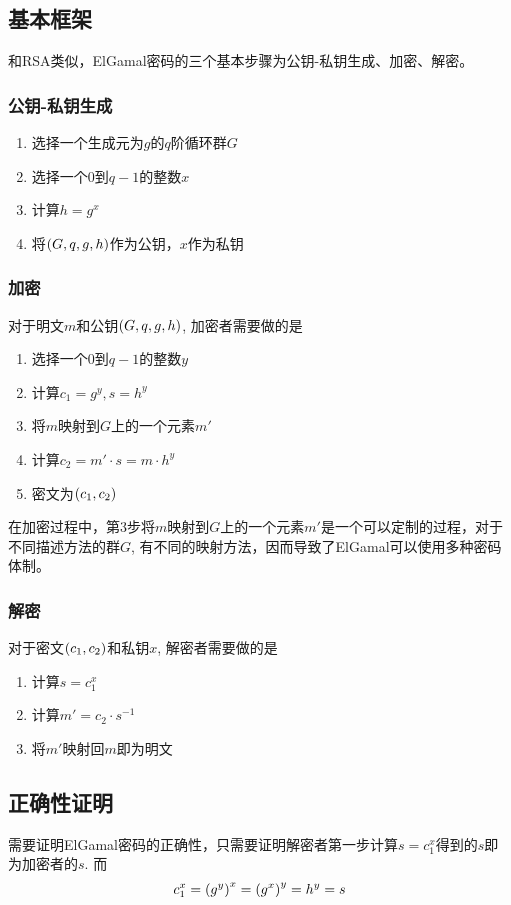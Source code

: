\subsection{基本框架}
和RSA类似，ElGamal密码的三个基本步骤为公钥-私钥生成、加密、解密。
\subsubsection{公钥-私钥生成}
\begin{enumerate}
	\item 选择一个生成元为$g$的$q$阶循环群$G$
	\item 选择一个$0$到$q-1$的整数$x$
	\item 计算$h=g^x$
	\item 将$\left( {G, q, g, h}\right)$作为公钥，$x$作为私钥
\end{enumerate}
\subsubsection{加密}
对于明文$m$和公钥$\left( {G, q, g, h}\right)$, 加密者需要做的是
\begin{enumerate}
	\item 选择一个$0$到$q-1$的整数$y$
	\item 计算$c_1=g^y, s=h^y$
	\item 将$m$映射到$G$上的一个元素$m'$
	\item 计算$c_2=m'\cdot s=m\cdot h^y$
	\item 密文为$\left( {c_1, c_2}\right)$
\end{enumerate}

在加密过程中，第3步将$m$映射到$G$上的一个元素$m'$是一个可以定制的过程，对于不同描述方法的群$G$, 有不同的映射方法，因而导致了ElGamal可以使用多种密码体制。
\subsubsection{解密}
对于密文$\left( {c_1, c_2}\right)$和私钥$x$, 解密者需要做的是
\begin{enumerate}
	\item 计算$s=c_1^x$
	\item 计算$m'=c_2\cdot s^{-1}$
	\item 将$m'$映射回$m$即为明文
\end{enumerate}
\subsection{正确性证明}
需要证明ElGamal密码的正确性，只需要证明解密者第一步计算$s=c_1^x$得到的$s$即为加密者的$s$. 而
\[c_1^x=\left( {g^y}\right)^x=\left( {g^x}\right)^y=h^y=s\]

